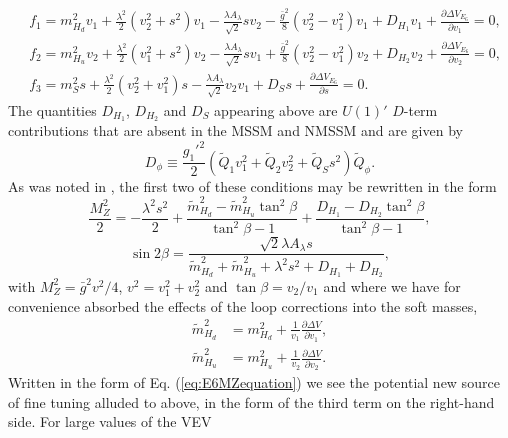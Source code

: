 \documentclass[preprint,amsmath,amssymb,aps,superscriptaddress,prd,showpacs,floatfix,nofootinbib]{revtex4-1}
\begin{document}
\begin{subequations}\label{eq:E6EWSBConditions}
\begin{align}
&f_1=m_{H_d}^2v_1+\frac{\lambda^2}{2}(v_2^2+s^2)v_1-\frac{\lambda A_\lambda}{\sqrt{2}}sv_2-\frac{\bar{g}^2}{8}
(v_2^2-v_1^2)v_1+D_{H_1}v_1+\frac{\partial \Delta V_{E_6}}{\partial v_1}=0,\label{eq:E6EWSBcondition1} \\
&f_2=m_{H_u}^2v_2+\frac{\lambda^2}{2}(v_1^2+s^2)v_2-\frac{\lambda A_\lambda}{\sqrt{2}}sv_1+\frac{\bar{g}^2}{8}
(v_2^2-v_1^2)v_2+D_{H_2}v_2+\frac{\partial \Delta V_{E_6}}{\partial v_2}=0,\label{eq:E6EWSBcondition2} \\
&f_3=m_S^2s+\frac{\lambda^2}{2}(v_2^2+v_1^2)s-\frac{\lambda A_\lambda}{\sqrt{2}}v_2v_1+D_Ss+\frac{\partial \Delta V_{E_6}}{\partial s}=0.\label{eq:E6EWSBcondition3}
\end{align}
\end{subequations}
The quantities $D_{H_1}$, $D_{H_2}$ and $D_S$ appearing above are
$U(1)'$ $D$-term contributions that are absent in the MSSM and NMSSM
and are given by
\begin{equation}\label{eq:E6Dterms}
D_\phi\equiv \frac{g_1'^2}{2}\left (
\tilde{Q}_1v_1^2+\tilde{Q}_2v_2^2+\tilde{Q}_Ss^2\right
)\tilde{Q}_\phi.
\end{equation}
As was noted in \cite{Athron:2013ipa}, the first two of these
conditions may be rewritten in the form
\begin{equation}\label{eq:E6MZequation}
\frac{M_Z^2}{2}=-\frac{\lambda^2s^2}{2}+\frac{\tilde{m}_{H_d}^2-\tilde{m}_{H_u}^2\tan^2\beta}{\tan^2\beta-1}+\frac{D_{H_1}-D_{H_2}\tan^2\beta}{\tan^2\beta-1},
\end{equation}
\begin{equation}\label{eq:E6sin2bequation}
\sin 2\beta=\frac{\sqrt{2}\lambda A_{\lambda} s}{\tilde{m}_{H_d}^2+\tilde{m}_{H_u}^2+\lambda^2s^2+D_{H_1}+D_{H_2}},
\end{equation}
with $M_Z^2=\bar{g}^2v^2/4$, $v^2=v_1^2+v_2^2$ and $\tan\beta =
v_2/v_1$ and where we have for convenience absorbed the effects of the
loop corrections into the soft masses,
\begin{align*}
\tilde{m}_{H_d}^2&=m_{H_d}^2+\frac{1}{v_1}\frac{\partial \Delta
  V}{\partial
  v_1},\\ \tilde{m}_{H_u}^2&=m_{H_u}^2+\frac{1}{v_2}\frac{\partial
  \Delta V}{\partial v_2}.
\end{align*}
Written in the form of Eq. (\ref{eq:E6MZequation}) we see the
potential new source of fine tuning alluded to above, in the form of
the third term on the right-hand side. For large values of the VEV
\end{document}

